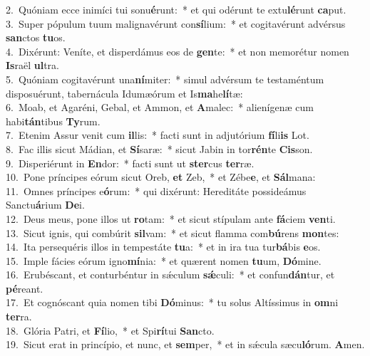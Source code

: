 {2.~}Quóniam ecce inimíci tui sonu\textbf{é}runt:~* et qui odérunt te extu\textbf{lé}runt \textbf{ca}put.\\
{3.~}Super pópulum tuum malignavérunt con\textbf{sí}lium:~* et cogitavérunt advérsus \textbf{san}ctos \textbf{tu}os.\\
{4.~}Dixérunt: Veníte, et disperdámus eos de \textbf{gen}te:~* et non memorétur nomen \textbf{Is}raël \textbf{ul}tra.\\
{5.~}Quóniam cogitavérunt una\textbf{ní}miter:~* simul advérsum te testaméntum disposuérunt, tabernácula Idumæórum et Is\textbf{ma}he\textbf{lí}tæ:\\
{6.~}Moab, et Agaréni, Gebal, et Ammon, et \textbf{A}malec:~* alienígenæ cum habi\textbf{tán}tibus \textbf{Ty}rum.\\
{7.~}Etenim Assur venit cum \textbf{il}lis:~* facti sunt in adjutórium \textbf{fí}li\textbf{is} Lot.\\
{8.~}Fac illis sicut Mádian, et \textbf{Sí}saræ:~* sicut Jabin in tor\textbf{rén}te \textbf{Cis}son.\\
{9.~}Disperiérunt in \textbf{En}dor:~* facti sunt ut \textbf{ster}cus \textbf{ter}ræ.\\
{10.~}Pone príncipes eórum sicut Oreb, \textbf{et} Zeb,~* et Zébe\textbf{e}, et \textbf{Sál}mana:\\
{11.~}Omnes príncipes e\textbf{ó}rum:~* qui dixérunt: Hereditáte possideámus Sanctu\textbf{á}rium \textbf{De}i.\\
{12.~}Deus meus, pone illos ut \textbf{ro}tam:~* et sicut stípulam ante \textbf{fá}ciem \textbf{ven}ti.\\
{13.~}Sicut ignis, qui combúrit \textbf{sil}vam:~* et sicut flamma com\textbf{bú}rens \textbf{mon}tes:\\
{14.~}Ita persequéris illos in tempestáte \textbf{tu}a:~* et in ira tua tur\textbf{bá}bis \textbf{e}os.\\
{15.~}Imple fácies eórum igno\textbf{mí}nia:~* et quærent nomen \textbf{tu}um, \textbf{Dó}mine.\\
{16.~}Erubéscant, et conturbéntur in sǽculum \textbf{sǽ}culi:~* et confun\textbf{dán}tur, et \textbf{pé}reant.\\
{17.~}Et cognóscant quia nomen tibi \textbf{Dó}minus:~* tu solus Altíssimus in \textbf{om}ni \textbf{ter}ra.\\
{18.~}Glória Patri, et \textbf{Fí}lio,~* et Spi\textbf{rí}tui \textbf{San}cto.\\
{19.~}Sicut erat in princípio, et nunc, et \textbf{sem}per,~* et in sǽcula sæcu\textbf{ló}rum. \textbf{A}men.\\
